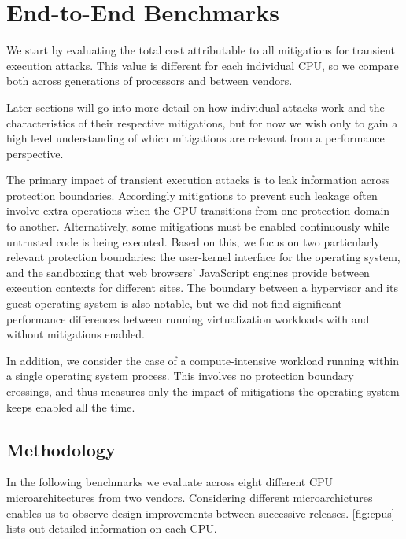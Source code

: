 \section{End-to-End Benchmarks}
\label{s:benchmarks}

We start by evaluating the total cost attributable to all mitigations for transient execution attacks.
This value is different for each individual CPU, so we compare both across generations of processors and between vendors.

Later sections will go into more detail on how individual attacks work and the characteristics of their respective mitigations, but for now we wish only to gain a high level understanding of which mitigations are relevant from a performance perspective.

The primary impact of transient execution attacks is to leak information across protection boundaries.
Accordingly mitigations to prevent such leakage often involve extra operations when the CPU transitions from one protection domain to another.
Alternatively, some mitigations must be enabled continuously while untrusted code is being executed.
Based on this, we focus on two particularly relevant protection boundaries: the user-kernel interface for the operating system, and the sandboxing that web browsers' JavaScript engines provide between execution contexts for different sites.
The boundary between a hypervisor and its guest operating system is also notable, but we did not find significant performance differences between running virtualization workloads with and without mitigations enabled.

In addition, we consider the case of a compute-intensive workload running within a single operating system process.
This involves no protection boundary crossings, and thus measures only the impact of mitigations the operating system keeps enabled all the time.

\subsection{Methodology}
In the following benchmarks we evaluate across eight different CPU microarchitectures from two vendors.
Considering different microarchictures enables us to observe design improvements between successive releases.
\autoref{fig:cpus} lists out detailed information on each CPU.

